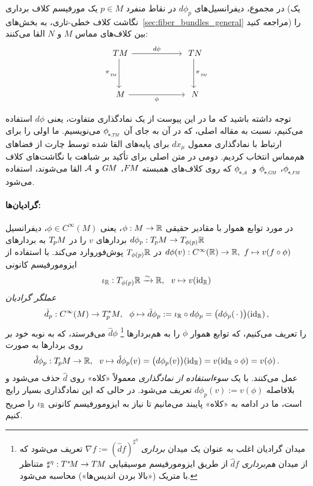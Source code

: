 در مجموع، دیفرانسیل‌های $d\phi_p$ در نقاط منفرد $p\in M$ یک مورفیسم کلاف برداری (یک نگاشت کلاف خطی-تاری، به بخش‌های~\ref{sec:fiber_bundles_general} مراجعه کنید) را بین کلاف‌های مماس $M$ و $N$ القا می‌کنند:
\begin{equation}
	\begin{tikzcd}[column sep=60pt, row sep=35, font=\normalsize]
		TM
		\arrow[r, "d\phi"]
		\arrow[d, "\piTM"']
		&
		TN
		\arrow[d, "\piTM"]
		\\
		M
		\arrow[r, "\phi"']
		&
		N
	\end{tikzcd}
\end{equation}

توجه داشته باشید که ما در این پیوست از یک نمادگذاری متفاوت، یعنی $d\phi$ استفاده می‌کنیم، نسبت به مقاله اصلی، که در آن به جای آن $\dphiTM$ می‌نویسیم.
ما اولی را برای ارتباط با نمادگذاری معمول $dx_\mu$ برای پایه‌های القا شده توسط چارت از فضاهای هم‌مماس انتخاب کردیم.
دومی در متن اصلی برای تأکید بر شباهت با نگاشت‌های کلاف $\dphiFM$، $\dphiGM$ و $\dphiA$ که روی کلاف‌های همبسته $F\mkern-1.5muM$، $G\mkern-1.4muM$ و $\mathcal{A}$ القا می‌شوند، استفاده می‌شود.



\paragraph{گرادیان‌ها:}
در مورد توابع هموار با مقادیر حقیقی $\phi: M \to \mathbb{R}$، یعنی $\phi \in C^\infty(M)$، دیفرانسیل $d\phi_p: T_{\mkern-1.5mu p}\mkern-.5muM \to T_{\phi(p)}\mathbb{R}$ بردارهای $v$ را در $T_{\mkern-1.5mu p}\mkern-.5muM$ به بردارهای $d\phi(v): C^\infty(\mathbb{R}) \to \mathbb{R},\ f \mapsto v(f \circ \phi)$ در $T_{\phi(p)}\mathbb{R}$ پوش‌فوروارد می‌کند.
با استفاده از ایزومورفیسم کانونی
\begin{align}\label{eq:canon_isom_TR_R}
	\iota_{\R}: T_{\phi(p)}\R \xrightarrow{\sim} \R,\ \ v \mapsto v(\id_{\R})
\end{align}
\emph{عملگر گرادیان}
\begin{align}
	\hat{d}_p: C^\infty(M) \to T_{\mkern-1.5mu p}^{\mkern-0mu *}\mkern-1muM,\ \ \phi \mapsto  \hat{d}\phi_p := \iota_{\mathbb{R}} \circ d\phi_p = \big( d\phi_p(\,\cdot\,) \big)(\mathrm{id}_{\mathbb{R}}) \,,
\end{align}
را تعریف می‌کنیم، که توابع هموار $\phi$ را به هم‌بردارها%
\footnote{
	میدان گرادیان اغلب به عنوان یک میدان \emph{برداری} $\nabla f := (\hat{d}f)^{\sharp^\eta}$ تعریف می‌شود که از میدان \emph{هم‌برداری} $\hat{d}f$ از طریق ایزومورفیسم موسیقیایی $\sharp^\eta: T^{\mkern0.5mu *}\mkern-3.5muM \to T\mkern-1.5muM$ متناظر با متریک («بالا بردن اندیس‌ها») محاسبه می‌شود.
}
$\hat{d}\phi$ می‌فرستد، که به نوبه خود بر روی بردارها به صورت
\begin{align}\label{eq:gradient_vector_action}
	\hat{d}\phi_p: \TpM \to \R,\ \ v \mapsto \hat{d}\phi_p(v) = \big( d\phi_p(v) \big)(\id_{\R}) = v(\id_{\R} \circ \phi) = v(\phi) \,.
\end{align}
عمل می‌کنند. با یک \emph{سوءاستفاده از نمادگذاری} معمولاً «کلاه» روی $\hat{d}$ حذف می‌شود و بلافاصله $d\phi_p(v) := v(\phi)$ تعریف می‌شود.
در حالی که این نمادگذاری بسیار رایج است، ما در ادامه به «کلاه» پایبند می‌مانیم تا نیاز به ایزومورفیسم کانونی $\iota_{\mathbb{R}}$ را صریح کنیم.

